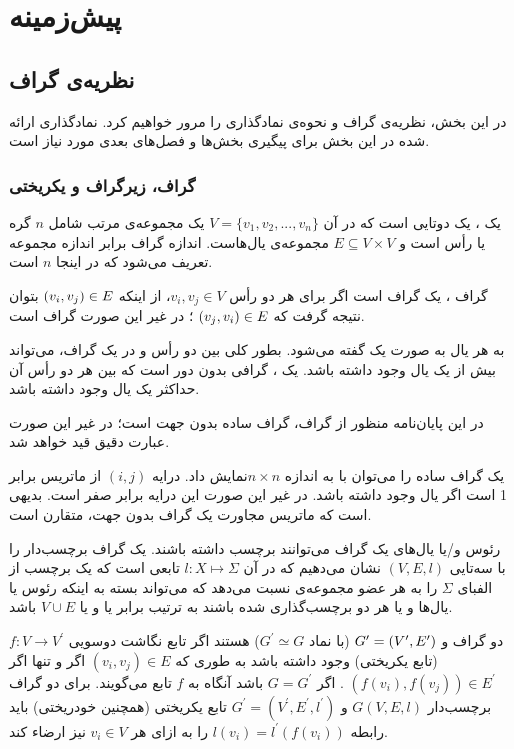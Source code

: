 \chapter{پیش‌زمینه}\label{chap:prerequisites}
\section{نظریه‌ی گراف}
در این بخش، نظریه‌ی گراف و نحوه‌ی نمادگذاری‌ را مرور خواهیم کرد. نمادگذاری ارائه شده در این بخش برای پیگیری بخش‌ها و فصل‌های بعدی مورد نیاز است.

\subsection{گراف، زیرگراف و یکریختی}
یک ، یک دوتایی  است که در آن
$V = \{v_{1},v_{2},...,v_{n}\}$
یک مجموعه‌ی مرتب شامل $n$ گره‌ یا رأس است و
$E \subseteq V\times V$
مجموعه‌ی یال‌هاست. اندازه گراف برابر اندازه مجموعه \V تعریف می‌شود که در اینجا $n$ است.

گراف ، یک گراف  است اگر برای هر دو رأس
$v_{i},v_{j} \in V$، از اینکه
$(v_{i},v_{j}) \in E$
بتوان نتیجه گرفت که
$(v_{j},v_{i}) \in E$
؛ در غیر این صورت گراف  است.

به هر یال به صورت 
یک  گفته می‌شود. بطور کلی بین دو رأس \Vi و \Vj در یک گراف، می‌تواند بیش از یک یال وجود داشته باشد. یک ، گرافی بدون دور است که بین هر دو رأس آن حداکثر یک یال وجود داشته باشد.

در این پایان‌نامه منظور از گراف، گراف ساده بدون جهت است؛ در غیر این صورت عبارت دقیق قید خواهد شد.

یک گراف ساده را می‌توان با  \A به اندازه $n\times n$نمایش داد. درایه $(i,j)$ از ماتریس \A برابر 1 است اگر یال  وجود داشته باشد. در غیر این صورت این درایه برابر صفر است. بدیهی است که ماتریس مجاورت یک گراف بدون جهت، متقارن است.

رئوس و/یا یال‌های یک گراف می‌توانند برچسب داشته باشند. یک گراف برچسب‌دار را با سه‌تایی $(V,E,l)$ نشان می‌دهیم که در آن $l: X \mapsto \Sigma$ تابعی است که یک برچسب از الفبای $\Sigma$ را به هر عضو مجموعه‌ی \X نسبت می‌دهد که \X می‌تواند بسته به اینکه رئوس یا یال‌ها و یا هر دو برچسب‌گذاری شده باشند به ترتیب برابر \V یا \E و یا $V\cup E$ باشد.

دو گراف  و
$G^{\prime} = (V^{\prime},E^{\prime})$
 (با نماد $G^{\prime} \simeq G$) هستند اگر تابع نگاشت دوسویی $f: V \rightarrow V^{\prime}$ (تابع یکریختی) وجود داشته باشد به طوری که
$(v_{i},v_{j}) \in E$
اگر و تنها اگر
$(f(v_{i}),f(v_{j})) \in E^{\prime}$
. اگر $G = G^{\prime}$ باشد آنگاه به $f$ تابع  می‌گویند. برای دو گراف برچسب‌دار $G(V,E,l)$ و $G^{\prime} = (V^{\prime},E^{\prime},l^{\prime})$ تابع یکریختی (همچنین خودریختی) باید رابطه 
$l(v_{i}) = l^{\prime}(f(v_{i}))$
 را به ازای هر $v_{i} \in V$ نیز ارضاء کند.
 
